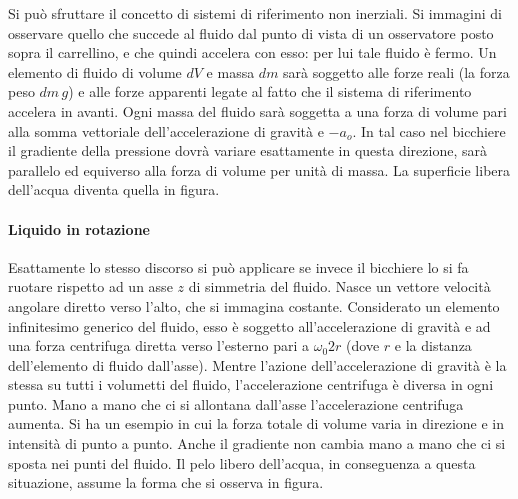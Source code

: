 \begin{figure}[htpb]
\end{figure}
\FloatBarrier
Si può sfruttare il concetto di sistemi di riferimento non inerziali. Si immagini di osservare quello che succede al fluido dal punto di vista di un osservatore posto sopra il carrellino, e che quindi accelera con esso: per lui tale fluido è fermo. Un elemento di fluido di volume $dV$ e massa $dm$ sarà soggetto alle forze reali (la forza peso $dm\,g$) e alle forze apparenti legate al fatto che il sistema di riferimento accelera in avanti. Ogni massa del fluido sarà soggetta a una forza di volume pari alla somma vettoriale dell'accelerazione di gravità e $-a_o$. In tal caso nel bicchiere il gradiente della pressione dovrà variare esattamente in questa direzione, sarà parallelo ed equiverso alla forza di volume per unità di massa. La superficie libera dell'acqua diventa quella in figura.

\paragraph{Liquido in rotazione} Esattamente lo stesso discorso si può applicare se invece il bicchiere lo si fa ruotare rispetto ad un asse $z$ di simmetria del fluido. Nasce un vettore velocità angolare diretto verso l'alto, che si immagina costante.
Considerato un elemento infinitesimo generico del fluido, esso è soggetto all'accelerazione di gravità e ad una forza centrifuga diretta verso l'esterno pari a $\omega_0 2r$ (dove $r$ e la distanza dell'elemento di fluido dall'asse).
Mentre l'azione dell'accelerazione di gravità è la stessa su tutti i volumetti del fluido, l'accelerazione centrifuga è diversa in ogni punto. Mano a mano che ci si allontana dall'asse l'accelerazione centrifuga aumenta. Si ha un esempio in cui la forza totale di volume varia in direzione e in intensità di punto a punto. Anche il gradiente non cambia mano a mano che ci si sposta nei punti del fluido. Il pelo libero dell'acqua, in conseguenza a questa situazione, assume la forma che si osserva in figura.

